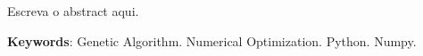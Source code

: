 Escreva o abstract aqui.

\vspace{\onelineskip}\noindent
\textbf{Keywords}: Genetic Algorithm. Numerical Optimization. Python. Numpy.
